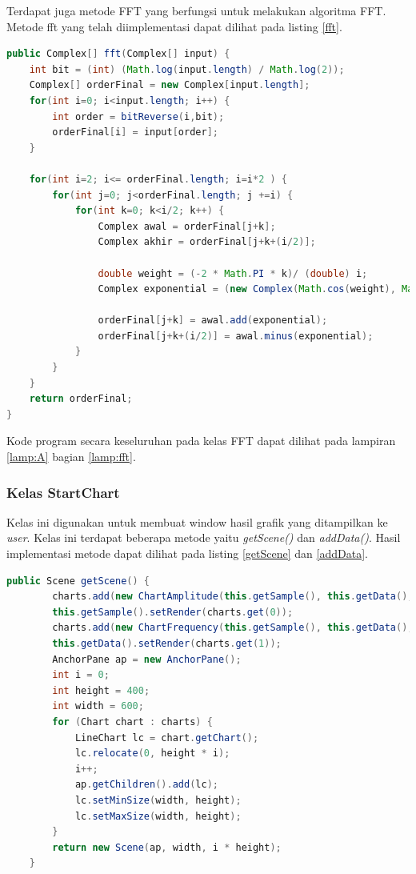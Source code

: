 Terdapat juga metode FFT yang berfungsi untuk melakukan algoritma FFT. Metode fft yang telah diimplementasi dapat dilihat pada listing \ref{fft}.
\begin{lstlisting}[language=Java, caption=Metode fft(), label=fft]
public Complex[] fft(Complex[] input) {
	int bit = (int) (Math.log(input.length) / Math.log(2));
	Complex[] orderFinal = new Complex[input.length];
	for(int i=0; i<input.length; i++) {
		int order = bitReverse(i,bit);
		orderFinal[i] = input[order];
	}
	
	for(int i=2; i<= orderFinal.length; i=i*2 ) {
		for(int j=0; j<orderFinal.length; j +=i) {
			for(int k=0; k<i/2; k++) {
				Complex awal = orderFinal[j+k];
				Complex akhir = orderFinal[j+k+(i/2)];
				
				double weight = (-2 * Math.PI * k)/ (double) i;
				Complex exponential = (new Complex(Math.cos(weight), Math.sin(weight)).multiplication(akhir));
				
				orderFinal[j+k] = awal.add(exponential);
				orderFinal[j+k+(i/2)] = awal.minus(exponential);
			}
		}
	}
	return orderFinal;
}
\end{lstlisting}
Kode program secara keseluruhan pada kelas FFT dapat dilihat pada lampiran \ref{lamp:A} bagian \ref{lamp:fft}.

\subsubsection{Kelas StartChart}
Kelas ini digunakan untuk membuat window hasil grafik yang ditampilkan ke \textit{user}. Kelas ini terdapat beberapa metode yaitu \textit{getScene()} dan \textit{addData()}. Hasil implementasi metode dapat dilihat pada listing \ref{getScene} dan \ref{addData}.
\begin{lstlisting}[language=Java, caption=Metode getScene(), label=getScene]
    public Scene getScene() {
        charts.add(new ChartAmplitude(this.getSample(), this.getData(), sensorId));
        this.getSample().setRender(charts.get(0));
        charts.add(new ChartFrequency(this.getSample(), this.getData(), sensorId));
        this.getData().setRender(charts.get(1));
        AnchorPane ap = new AnchorPane();
        int i = 0;
        int height = 400;
        int width = 600;
        for (Chart chart : charts) {
            LineChart lc = chart.getChart();
            lc.relocate(0, height * i);
            i++;
            ap.getChildren().add(lc);
            lc.setMinSize(width, height);
            lc.setMaxSize(width, height);
        }
        return new Scene(ap, width, i * height);
    }
\end{lstlisting}

